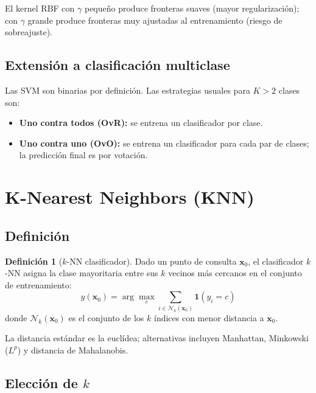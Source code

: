 \documentclass[12pt, a4paper]{article}
\theoremstyle{definition}
\newtheorem{definicion}{Definición}[section]
\theoremstyle{plain}
\theoremstyle{remark}
\newcommand{\bx}{\bm{x}}
\begin{document}
\begin{conceptoclave}
  El kernel RBF con $\gamma$ pequeño produce fronteras suaves (mayor regularización); con $\gamma$ grande produce fronteras muy ajustadas al entrenamiento (riesgo de sobreajuste).
\end{conceptoclave}

\subsection{Extensión a clasificación multiclase}

Las SVM son binarias por definición. Las estrategias usuales para $K > 2$ clases son:
\begin{itemize}
  \item \textbf{Uno contra todos (OvR):} se entrena un clasificador por clase.
  \item \textbf{Uno contra uno (OvO):} se entrena un clasificador para cada par de clases; la predicción final es por votación.
\end{itemize}

\section{K-Nearest Neighbors (KNN)}

\subsection{Definición}

\begin{definicion}[$k$-NN clasificador]
  Dado un punto de consulta $\bx_0$, el clasificador $k$-NN asigna la clase mayoritaria entre sus $k$ vecinos más cercanos en el conjunto de entrenamiento:
  \[
    \hat{y}(\bx_0) = \arg\max_c \sum_{i \in \mathcal{N}_k(\bx_0)} \mathbf{1}(y_i = c)
  \]
  donde $\mathcal{N}_k(\bx_0)$ es el conjunto de los $k$ índices con menor distancia a $\bx_0$.
\end{definicion}

La distancia estándar es la euclídea; alternativas incluyen Manhattan, Minkowski ($L^p$) y distancia de Mahalanobis.

\subsection{Elección de $k$}
\end{document}
